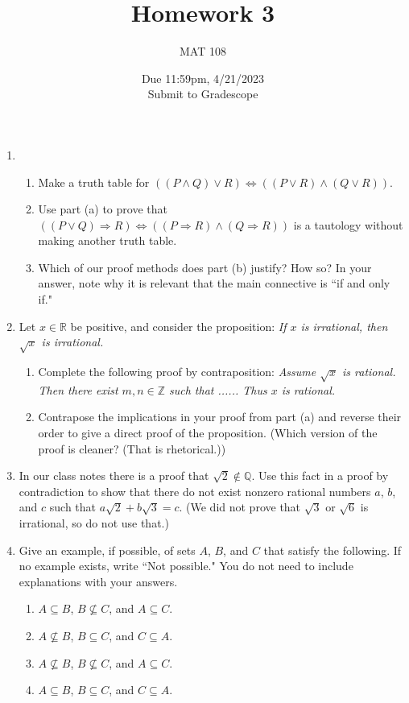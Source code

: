 \documentclass{article}
\title{Homework 3}
\author{MAT 108}
\date{Due 11:59pm, 4/21/2023\\
\vspace{0.1cm}
Submit to Gradescope}
\newcommand{\bR}{\mathbb{R}}
\newcommand{\bQ}{\mathbb{Q}}
\newcommand{\bZ}{\mathbb{Z}}
\begin{document}
\maketitle
{\large
\begin{enumerate}[labelindent=0pt,leftmargin=0pt]
\setlength{\itemsep}{13pt}
\item\begin{enumerate}
\item Make a truth table for $((P\land Q)\lor R)\Leftrightarrow
((P\lor R)\land (Q\lor R))$.
\item Use part (a) to prove that $((P\lor Q)\Rightarrow
R)\Leftrightarrow ((P\Rightarrow R)\land(Q\Rightarrow R))$ is a tautology
without making another truth table.
\item Which of our proof methods does part (b) justify? How so? In
your answer, note why it is relevant that the main connective is ``if and
only if."
\end{enumerate}
\item Let $x\in\bR$ be positive, and consider the proposition:
\textit{If $x$ is irrational, then $\sqrt{x}$ is irrational.}
\begin{enumerate}
\item Complete the following proof by contraposition: \textit{Assume
$\sqrt{x}$ is rational. Then there exist $m,n\in\bZ$ such that ...... Thus
$x$ is rational.}
\item Contrapose the implications in your proof from part (a) and
reverse their order to give a direct proof of the proposition. (Which
version of the proof is cleaner? (That is rhetorical.))
\end{enumerate}
\item In our class notes there is a proof that $\sqrt{2}\not\in\bQ$.
Use this fact in a proof by contradiction to show that there do not exist
nonzero rational numbers $a$, $b$, and $c$ such that
$a\sqrt{2}+b\sqrt{3}=c$. (We did not prove that $\sqrt{3}$ or $\sqrt{6}$
is irrational, so do not use that.)
\item Give an example, if possible, of sets $A$, $B$, and $C$ that
satisfy the following. If no example exists, write ``Not possible." You do
not need to include explanations with your answers.
\begin{enumerate}
\item $A\subseteq B$, $B\not\subseteq C$, and $A\subseteq C$.
\item $A\not\subseteq B$, $B\subseteq C$, and $C\subseteq A$.
\item $A\not\subseteq B$, $B\not\subseteq C$, and $A\subseteq C$.
\item $A\subseteq B$, $B\subseteq C$, and $C\subseteq A$.
\end{enumerate}
\end{enumerate}
}
\end{document}
